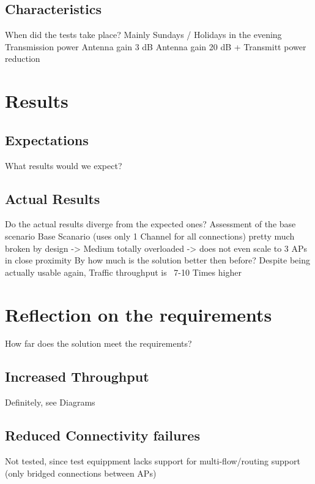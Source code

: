   \subsection{Characteristics}
    When did the tests take place?\newline
      Mainly Sundays / Holidays in the evening \newline
    Transmission power \newline
      Antenna gain 3 dB \newline
      Antenna gain 20 dB + Transmitt power reduction \newline
\section{Results}
  \subsection{Expectations}
    What results would we expect?\newline
  \subsection{Actual Results}
    Do the actual results diverge from the expected ones?\newline
    Assessment of the base scenario \newline
      Base Scanario (uses only 1 Channel for all connections) pretty much broken by design -> Medium totally overloaded -> does not even scale to 3 APs in close proximity \newline
    By how much is the solution better then before? \newline
      Despite being actually usable again, Traffic throughput is ~7-10 Times higher
\section{Reflection on the requirements}
  How far does the solution meet the requirements?\newline
  \subsection{Increased Throughput}
    Definitely, see Diagrams \newline
  \subsection{Reduced Connectivity failures}
    Not tested, since test equippment lacks support for multi-flow/routing support (only bridged connections between APs) \newline
